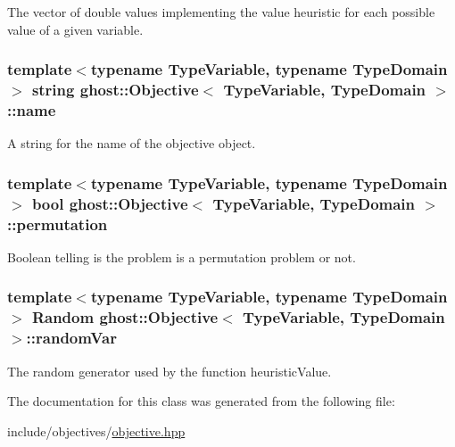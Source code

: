 The vector of double values implementing the value heuristic for each possible value of a given variable. 

\hypertarget{classghost_1_1Objective_ae9533a52b3600c826df6e20c65db1e7a}{
\subsubsection[{name}]{\setlength{\rightskip}{0pt plus 5cm}template$<$typename Type\-Variable, typename Type\-Domain$>$ string {\bf ghost\-::\-Objective}$<$ Type\-Variable, Type\-Domain $>$\-::name\hspace{0.3cm}{\ttfamily [protected]}}}\label{classghost_1_1Objective_ae9533a52b3600c826df6e20c65db1e7a}


A string for the name of the objective object. 

\hypertarget{classghost_1_1Objective_aae8345f4b7981f4b386eb58e447e0286}{
\subsubsection[{permutation}]{\setlength{\rightskip}{0pt plus 5cm}template$<$typename Type\-Variable, typename Type\-Domain$>$ bool {\bf ghost\-::\-Objective}$<$ Type\-Variable, Type\-Domain $>$\-::permutation\hspace{0.3cm}{\ttfamily [protected]}}}\label{classghost_1_1Objective_aae8345f4b7981f4b386eb58e447e0286}


Boolean telling is the problem is a permutation problem or not. 

\hypertarget{classghost_1_1Objective_a442da333edc70f47c33a15987c2a81b8}{
\subsubsection[{random\-Var}]{\setlength{\rightskip}{0pt plus 5cm}template$<$typename Type\-Variable, typename Type\-Domain$>$ {\bf Random} {\bf ghost\-::\-Objective}$<$ Type\-Variable, Type\-Domain $>$\-::random\-Var\hspace{0.3cm}{\ttfamily [protected]}}}\label{classghost_1_1Objective_a442da333edc70f47c33a15987c2a81b8}


The random generator used by the function heuristic\-Value. 



The documentation for this class was generated from the following file\-:\begin{DoxyCompactItemize}
\item 
include/objectives/\hyperlink{objective_8hpp}{objective.\-hpp}\end{DoxyCompactItemize}
